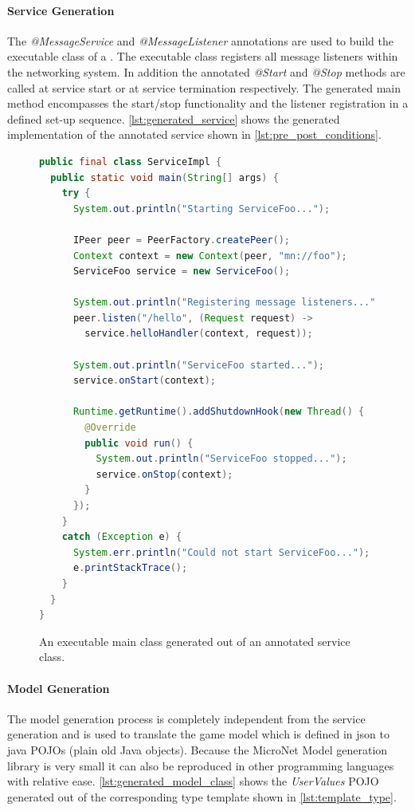 \paragraph{Service Generation}

The \textit{@MessageService} and \textit{@MessageListener} annotations are used
to build the executable class of a \ms{}. The executable class registers all
message listeners within the networking system. In addition the annotated
\textit{@Start} and \textit{@Stop} methods are called at service start or
at service termination respectively. The generated main method encompasses the
start/stop functionality and the listener registration in a defined set-up
sequence. \autoref{lst:generated_service} shows the generated implementation of
the annotated service shown in \autoref{lst:pre_post_conditions}.

\begin{figure}
\begin{lstlisting}[language=Java,firstnumber=1] 
public final class ServiceImpl {
  public static void main(String[] args) {
    try {
      System.out.println("Starting ServiceFoo...");

      IPeer peer = PeerFactory.createPeer();
      Context context = new Context(peer, "mn://foo");
      ServiceFoo service = new ServiceFoo();

      System.out.println("Registering message listeners...");
      peer.listen("/hello", (Request request) -> 
      	service.helloHandler(context, request));

      System.out.println("ServiceFoo started...");
      service.onStart(context);

      Runtime.getRuntime().addShutdownHook(new Thread() {
        @Override
        public void run() {
          System.out.println("ServiceFoo stopped...");
          service.onStop(context);
        }
      });
    }
    catch (Exception e) {
      System.err.println("Could not start ServiceFoo...");
      e.printStackTrace();
    }
  }
}
\end{lstlisting}
\caption{An executable \ms{} main class generated out of an annotated service
class.}
\label{lst:generated_service}
\end{figure}

\paragraph{Model Generation}

The model generation process is completely independent from the service
generation and is used to translate the game model which is defined in
\gls{json} to java POJOs (plain old Java objects). Because the MicroNet Model
generation library is very small it can also be reproduced in other programming
languages with relative ease. \autoref{lst:generated_model_class} shows the
\textit{UserValues} POJO generated out of the corresponding type template
shown in \autoref{lst:template_type}.

